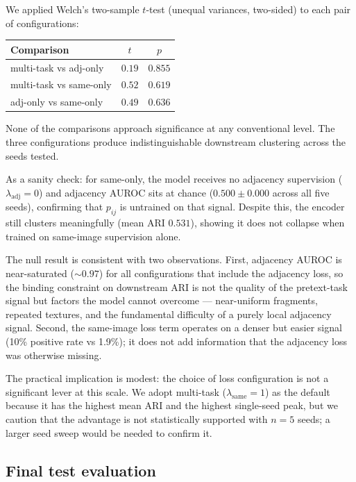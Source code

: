 \documentclass[12pt, a4paper]{article}
\begin{document}
We applied Welch's two-sample $t$-test (unequal variances, two-sided) to each pair of
configurations:

\begin{center}
\begin{tabular}{lcc}
\toprule
\textbf{Comparison} & $t$ & $p$ \\
\midrule
multi-task vs adj-only  & $0.19$ & $0.855$ \\
multi-task vs same-only & $0.52$ & $0.619$ \\
adj-only vs same-only   & $0.49$ & $0.636$ \\
\bottomrule
\end{tabular}
\end{center}

None of the comparisons approach significance at any conventional level. The three
configurations produce indistinguishable downstream clustering across the seeds tested.

As a sanity check: for same-only, the model receives no adjacency supervision
($\lambda_{\text{adj}} = 0$) and adjacency AUROC sits at chance
($0.500 \pm 0.000$ across all five seeds), confirming that $p_{ij}$ is
untrained on that signal. Despite this, the encoder still clusters meaningfully
(mean ARI $0.531$), showing it does not collapse when trained on same-image
supervision alone.

The null result is consistent with two observations. First,
adjacency AUROC is near-saturated ($\sim 0.97$) for all configurations that
include the adjacency loss, so the binding constraint on downstream ARI is not the
quality of the pretext-task signal but factors the model cannot overcome --- near-uniform
fragments, repeated textures, and the fundamental difficulty of a purely local
adjacency signal. Second, the same-image loss term operates on a denser but easier
signal (10\% positive rate vs 1.9\%); it does not add information that the adjacency
loss was otherwise missing.

The practical implication is modest: the choice of loss configuration is not a
significant lever at this scale. We adopt multi-task ($\lambda_{\text{same}} = 1$) as
the default because it has the highest mean ARI and the highest single-seed peak, but we
caution that the advantage is not statistically supported with $n = 5$ seeds; a larger
seed sweep would be needed to confirm it.


\subsection{Final test evaluation}
\label{sec:test-eval}
\end{document}
